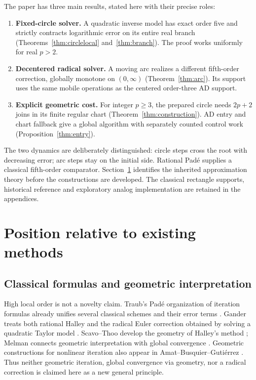 \documentclass[11pt,a4paper]{article}
\begin{document}
The paper has three main results, stated here with their precise roles:
\begin{enumerate}
\item \textbf{Fixed-circle solver.} A quadratic inverse model has exact order five and strictly contracts logarithmic error on its entire real branch (Theorems~\ref{thm:circlelocal} and~\ref{thm:branch}). The proof works uniformly for real $p>2$.
\item \textbf{Decentered radical solver.} A moving arc realizes a different fifth-order correction, globally monotone on $(0,\infty)$ (Theorem~\ref{thm:arc}). Its support uses the same mobile operations as the centered order-three AD support.
\item \textbf{Explicit geometric cost.} For integer $p\ge3$, the prepared circle needs $2p+2$ joins in its finite regular chart (Theorem~\ref{thm:construction}). AD entry and chart fallback give a global algorithm with separately counted control work (Proposition~\ref{thm:entry}).
\end{enumerate}
The two dynamics are deliberately distinguished: circle steps cross the root with decreasing error; arc steps stay on the initial side. Rational Pad\'e supplies a classical fifth-order comparator. Section~\ref{sec:prior} identifies the inherited approximation theory before the constructions are developed. The classical rectangle supports, historical reference and exploratory analog implementation are retained in the appendices.

\clearpage
\section{Position relative to existing methods}\label{sec:prior}
\subsection{Classical formulas and geometric interpretation}
High local order is not a novelty claim. Traub's Pad\'e organization of iteration formulas already unifies several classical schemes and their error terms \cite{traub1961,traub1964}. Gander treats both rational Halley and the radical Euler correction obtained by solving a quadratic Taylor model \cite[pp.~131--133]{gander1985}. Scavo--Thoo develop the geometry of Halley's method \cite{scavo1995}; Melman connects geometric interpretation with global convergence \cite{melman1997}. Geometric constructions for nonlinear iteration also appear in Amat--Busquier--Guti\'errez \cite{amat2003}. Thus neither geometric iteration, global convergence via geometry, nor a radical correction is claimed here as a new general principle.
\end{document}
